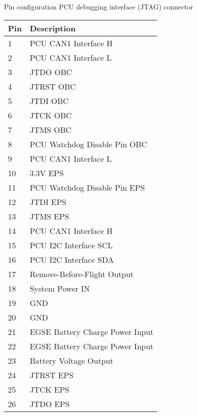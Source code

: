 \begin{appendix}
		\caption{Pin configuration PCU debugging interface (JTAG) connector}
		\begin{center}
			
			
			\begin{tabular}{p{3cm}p{6cm}}
				\toprule
				
				Pin & Description \\ \midrule
				1 & PCU CAN1 Interface H \\ 
				2 & PCU CAN1 Interface L \\ 
				3 & JTDO OBC \\ 
				4 & JTRST OBC \\ 
				5 & JTDI OBC \\ 
				6 & JTCK OBC \\ 
				7 & JTMS OBC \\ 
				8 & PCU Watchdog Disable Pin OBC \\ 
				9 & PCU CAN1 Interface L \\ 
				10 & 3.3V EPS \\ 
				11 & PCU Watchdog Disable Pin EPS \\ 
				12 & JTDI EPS \\ 
				13 & JTMS EPS \\ 
				14 & PCU CAN1 Interface H \\ 
				15 & PCU I2C Interface SCL \\ 
				16 & PCU I2C Interface SDA \\ 
				17 & Remove-Before-Flight Output \\ 
				18 & System Power IN \\ 
				19 & GND \\ 
				20 & GND \\ 
				21 & EGSE Battery Charge Power Input \\ 
				22 & EGSE Battery Charge Power Input \\ 
				23 & Battery Voltage Output \\ 
				24 & JTRST EPS \\ 
				25 & JTCK EPS \\ 
				26 & JTDO EPS \\  
				\bottomrule
			\end{tabular}
			\label{jtag}
		\end{center}
	










\end{appendix}
